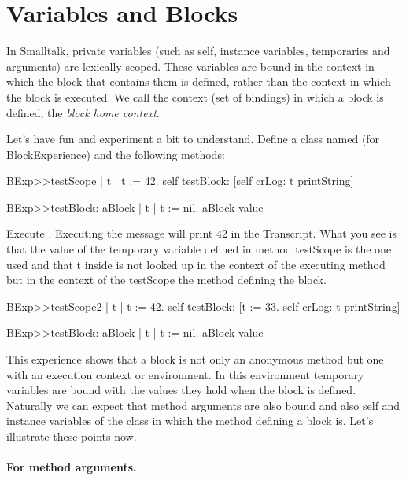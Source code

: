 \documentclass[a4paper,10pt,twoside]{book}
\begin{document}
\section{Variables and Blocks}
In Smalltalk, private variables (such as self, instance variables, temporaries and arguments) are 
lexically scoped. These variables are bound in the context in which the block that contains them is defined, rather than the context in which the block is executed.  We call the context (set of bindings) in which a block is defined, the \emph{block home context}.


Let's have fun and experiment a bit to understand. 
Define a class named  (for BlockExperience) and the following methods:

\begin{code}{}
BExp>>testScope 
	| t | 
	t := 42. 
	self testBlock: [self crLog: t printString] 
	
BExp>>testBlock: aBlock 
	| t | 
	t := nil. 
	aBlock value 
\end{code}

Execute . Executing the  message will print 42 in the Transcript. What you see is that the value of the temporary variable  defined in method testScope is the one used and that t inside  is not looked up in the context of the executing method  but in the context of the testScope the method defining the block.

\begin{code}{}
BExp>>testScope2 
	| t | 
	t := 42. 
	self testBlock: [t := 33.
					self crLog: t printString] 	
	
BExp>>testBlock: aBlock
	| t | 
	t := nil. 
	aBlock value 
\end{code}

This experience shows that a block is not only an anonymous method but one with an execution context or environment. In this environment temporary variables are bound with the values they hold when the block 
is defined. Naturally we can expect that method arguments are also bound and also self and instance variables of the class in which the method defining a block is. Let's illustrate these points now. 

\paragraph{For method arguments.}
\end{document}
